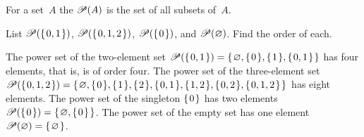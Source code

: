 \documentclass{ibl}  %
\begin{document}
\begin{df}
For a set~$A$ the  $\powerset(A)$ is the set of all
subsets of~$A$.
\end{df}

\begin{problem}[\midlength] 
  List 
  $\powerset(\set{0,1})$,   
  $\powerset(\set{0,1,2})$,   
  $\powerset(\set{0})$, and   
  $\powerset(\emptyset)$.
  Find the order of each.   
\begin{answer}
The power set of the two-element set 
$\powerset(\set{0,1})=\set{\emptyset, \set{0}, \set{1}, \set{0,1}}$
has four elements, that is, is of order four.
The power set of the three-element set 
$\powerset(\set{0,1,2})=\set{\emptyset,\set{0},\set{1},\set{2},
                             \set{0,1},\set{1,2},\set{0,2},\set{0,1,2}}$
has eight elements.
The power set of the singleton $\set{0}$ has two elements
$\powerset(\set{0})=\set{\emptyset,\set{0}}$.
The power set of the empty set has one element
$\powerset(\emptyset)=\set{\emptyset}$.   
\end{answer}
\end{problem}
\end{document}
